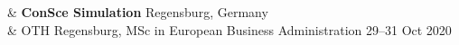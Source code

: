 %
{\color{OliveGreen}{Talks and tutorials}} 
& \textbf{ConSce Simulation} \hfill Regensburg, Germany \\
& OTH Regensburg, MSc in European Business Administration \hfill 29--31 Oct 2020 \\

